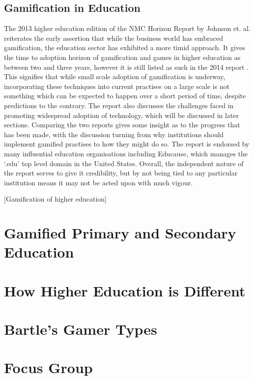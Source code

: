\documentclass[12pt]{article}
\begin{document}
\subsection{Gamification in Education}
The 2013 higher education edition of the NMC Horizon Report by Johnson et. al. \cite{johnson2013nmc} reiterates the early assertion that while the business world has embraced gamification, the education sector has exhibited a more timid approach. It gives the time to adoption horizon of gamification and games in higher education as between two and three years, however it is still listed as such in the 2014 report \cite{johnson2014nmc}. This signifies that while small scale adoption of gamification is underway, incorporating these techniques into current practises on a large scale is not something which can be expected to happen over a short period of time, despite predictions to the contrary. The report also discusses the challenges faced in promoting widespread adoption of technology, which will be discussed in later sections. Comparing the two reports gives some insight as to the progress that has been made, with the discussion turning from why institutions should implement gamified practises to how they might do so. The report is endorsed by many influential education organisations including Educause, which manages the `.edu' top level domain in the United States.  Overall, the independent nature of the report serves to give it credibility, but by not being tied to any particular institution means it may not be acted upon with much vigour.


[Gamification of higher education]

\section{Gamified Primary and Secondary Education}

\section{How Higher Education is Different}

\section{Bartle's Gamer Types}

\section{Focus Group}
\end{document}
